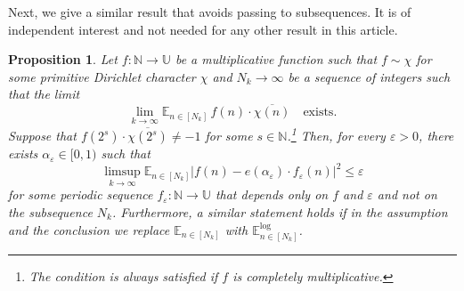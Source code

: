 \documentclass[11pt]{amsart}
\newtheorem{proposition}[lemma]{Proposition}
\theoremstyle{definition}
\newcommand{\lE}{\mathbb{E}^{\log}}
\newcommand{\E}{{\mathbb E}}
\newcommand{\N}{{\mathbb N}}
\newcommand{\U}{{\mathbb U}}
\begin{document}
Next, we give a  similar  result that  avoids passing to subsequences.   It is of
  independent interest and not needed for any other result in this article.
 \begin{proposition}\label{P:RAPchi'}
	Let $f\colon \N\to \U$ be a   multiplicative function such that $f\sim \chi$
	for some primitive Dirichlet character $\chi$  and $N_k\to \infty$ be a sequence of integers  such that the limit
	$$
	\lim_{k\to\infty}\E_{n\in [N_k]}\, f(n)\cdot \overline{\chi(n)}\quad \text{exists}.
	$$
	Suppose that $f(2^s)\cdot \overline{\chi(2^s)}\neq -1$ for some $s\in \N$.\footnote{The condition is always satisfied  if $f$ is completely multiplicative.}
	Then, for every $\varepsilon>0$, there exists $\alpha_\varepsilon \in [0,1)$ such that
	$$
	\limsup_{k\to\infty} \E_{n\in [N_k]}|f(n)-e(\alpha_\varepsilon)\cdot f_{\varepsilon}(n)|^2\leq \varepsilon
	$$
	for some periodic sequence $f_{\varepsilon}\colon \N\to \U$ that depends only on $f$ and $\varepsilon$ and not on the subsequence $N_k$.
 Furthermore, a similar statement holds if in the assumption and the conclusion we replace $\E_{n\in [N_k]}$ with  $\lE_{n\in [N_k]}$.
\end{proposition}
\end{document}
